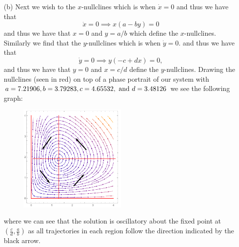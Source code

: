 \documentclass[12pt]{report}
\begin{document}
\begin{solution}
\begin{enumerate}
        \item [(b)]
            Next we wish to the $x$-nullclines which is when $\dot x = 0$ and thus we have that
            \[ 
                \dot x = 0 \implies x(a - by)=0
            \]
            and thus we have that $x=0$ and $y=a/b$ which define the $x$-nullclines. Similarly we find that the $y$-nullclines which is when $\dot y = 0$. and thus we have that
            \[ 
                \dot y = 0 \implies y(-c+dx) = 0,
            \] 
            and thus we have that $y=0$ and $x=c/d$ define the $y$-nullclines. Drawing the nullclines (seen in red) on top of a phase portrait of our system with $a=7.21906, b=3.79283, c=4.65532, {~\text{and}~} d=3.48126$ we see the following graph:
            \begin{figure}[H]
                \centering
                \includegraphics[width=0.5\textwidth,height=\textwidth,keepaspectratio]{images/9-b-1.png}
                \label{fig9}
            \end{figure}
            where we can see that the solution is oscillatory about the fixed point at $\left(\frac{c}{d},\frac{a}{b}\right)$ as all trajectories in each region follow the direction indicated by the black arrow. 




\end{enumerate}
\end{solution}
\end{document}
